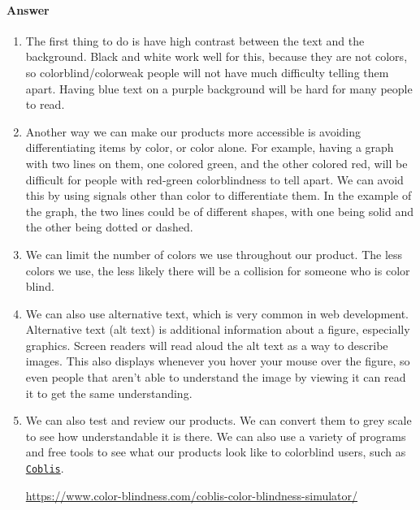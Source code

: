 \documentclass{article}
\begin{document}
\paragraph{Answer}
\begin{enumerate}
	\item The first thing to do is have high contrast between the text and the background. Black and white work well for this, because they are not colors, so colorblind/colorweak people will not have much difficulty telling them apart. Having blue text on a purple background will be hard for many people to read.
	
	\item Another way we can make our products more accessible is avoiding differentiating items by color, or color alone. For example, having a graph with two lines on them, one colored green, and the other colored red, will be difficult for people with red-green colorblindness to tell apart. We can avoid this by using signals other than color to differentiate them. In the example of the graph, the two lines could be of different shapes, with one being solid and the other being dotted or dashed.
	
	\item We can limit the number of colors we use throughout our product. The less colors we use, the less likely there will be a collision for someone who is color blind.
	
	\item We can also use alternative text, which is very common in web development. Alternative text (alt text) is additional information about a figure, especially graphics. Screen readers will read aloud the alt text as a way to describe images. This also displays whenever you hover your mouse over the figure, so even people that aren't able to understand the image by viewing it can read it to get the same understanding.
	
	\item We can also test and review our products. We can convert them to grey scale to see how understandable it is there. We can also use a variety of programs and free tools to see what our products look like to colorblind users, such as \href{https://www.color-blindness.com/coblis-color-blindness-simulator/}{\nolinkurl{Coblis}}. 
	
	\url{https://www.color-blindness.com/coblis-color-blindness-simulator/}

\end{enumerate}
\end{document}
